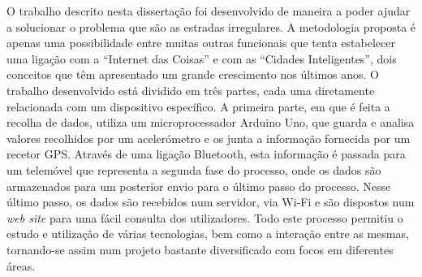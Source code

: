 O trabalho descrito nesta dissertação foi desenvolvido de maneira a poder ajudar a solucionar o problema que são as estradas irregulares.
A metodologia proposta é apenas uma possibilidade entre muitas outras funcionais que tenta estabelecer uma ligação com a ``Internet das Coisas'' e com as ``Cidades Inteligentes'', dois conceitos que têm apresentado um grande crescimento nos últimos anos.
O trabalho desenvolvido está dividido em três partes, cada uma diretamente relacionada com um dispositivo específico.
A primeira parte, em que é feita a recolha de dados, utiliza um microprocessador Arduino Uno, que guarda e analisa valores recolhidos por um acelerómetro e os junta a informação fornecida por um recetor GPS.
Através de uma ligação Bluetooth, esta informação é passada para um telemóvel que representa a segunda fase do processo, onde os dados são armazenados para um posterior envio para o último passo do processo.
Nesse último passo, os dados são recebidos num servidor, via Wi-Fi e são dispostos num \emph{web site} para uma fácil consulta dos utilizadores.
Todo este processo permitiu o estudo e utilização de várias tecnologias, bem como a interação entre as mesmas, tornando-se assim num projeto bastante diversificado com focos em diferentes áreas.